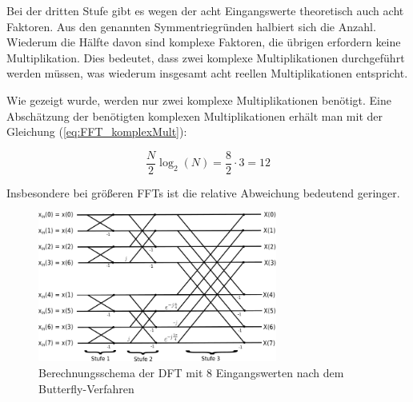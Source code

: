 Bei der dritten Stufe gibt es wegen der acht Eingangswerte theoretisch auch acht Faktoren. Aus den genannten Symmentriegründen halbiert sich die Anzahl. Wiederum die Hälfte davon 
sind komplexe Faktoren, die übrigen erfordern keine Multiplikation. Dies bedeutet, dass zwei komplexe Multiplikationen durchgeführt werden müssen, was wiederum insgesamt acht reellen 
Multiplikationen entspricht. 


Wie gezeigt wurde, werden nur zwei komplexe Multiplikationen benötigt. Eine Abschätzung der benötigten komplexen Multiplikationen erhält man mit der Gleichung (\ref{eq:FFT_komplexMult}):

\begin{equation}\label{eq:FFT_komplexMult}
 \frac{N}{2}\log_2(N) = \frac{8}{2}\cdot 3 = 12
\end{equation}

Insbesondere bei größeren FFTs ist die relative Abweichung bedeutend geringer.


\begin{figure}[htbp]
 \centering
 \includegraphics[width=0.7\textwidth]{img/Butterfly.png}
 \caption{Berechnungsschema der DFT mit 8 Eingangswerten nach dem Butterfly-Verfahren}
 \label{pic:Butterfly}
\end{figure}


